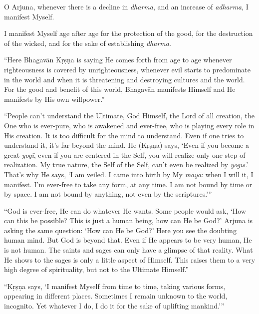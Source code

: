 {O Arjuna, whenever there is a decline in \textit{dharma}, and an increase of \textit{adharma}, I manifest Myself.}

{I manifest Myself age after age for the protection of the good, for the destruction of the wicked, and for the sake of establishing \textit{dharma}.}

\enquote{Here Bhagavān Kṛṣṇa is saying He comes forth from age to age whenever righteousness is covered by unrighteousness, whenever evil starts to predominate in the world and when it is threatening and destroying cultures and the world. For the good and benefit of this world, Bhagavān manifests Himself and He manifests by His own willpower.}

\enquote{People can’t understand the Ultimate, God Himself, the Lord of all creation, the One who is ever-pure, who is awakened and ever-free, who is playing every role in His creation. It is too difficult for the mind to understand. Even if one tries to understand it, it’s far beyond the mind. He (Kṛṣṇa) says, \enquote{Even if you become a great \textit{yogī}, even if you are centered in the Self, you will realize only one step of realization. My true nature, the Self of the Self, can’t even be realized by \textit{yogīs}.} That’s why He says, \enquote{I am veiled. I came into birth by My \textit{māyā}: when I will it, I manifest. I’m ever-free to take any form, at any time. I am not bound by time or by space. I am not bound by anything, not even by the scriptures.}}

\enquote{God is ever-free, He can do whatever He wants. Some people would ask, \enquote{How can this be possible? This is just a human being, how can He be God?} Arjuna is asking the same question: \enquote{How can He be God?} Here you see the doubting human mind. But God is beyond that. Even if He appears to be very human, He is not human. The saints and sages can only have a glimpse of that reality. What He shows to the sages is only a little aspect of Himself. This raises them to a very high degree of spirituality, but not to the Ultimate Himself.}

\enquote{Kṛṣṇa says, \enquote{I manifest Myself from time to time, taking various forms, appearing in different places. Sometimes I remain unknown to the world, incognito. Yet whatever I do, I do it for the sake of uplifting mankind.}}

